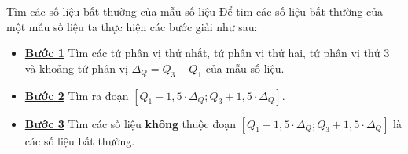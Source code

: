 \begin{dang}{Tìm các số liệu bất thường của mẫu số liệu}
	Để tìm các số liệu bất thường của một mẫu số liệu ta thực hiện các bước giải như sau:
	\begin{itemize}
		\item \textbf{\underline{Bước 1} } Tìm các tứ phân vị thứ nhất, tứ phân vị thứ hai, tứ phân vị thứ 3 và khoảng tứ phân vị $\Delta_{Q}=Q_3 - Q_1$ của mẫu số liệu.
		\item \textbf{\underline{Bước 2} } Tìm ra đoạn $\left[Q_1-1{,}5 \cdot 
		\Delta_{Q}; Q_3+1{,}5 \cdot 
		\Delta_{Q} \right]$.
		\item \textbf{\underline{Bước 3} } Tìm các số liệu \textbf{không} thuộc đoạn $\left[Q_1-1{,}5 \cdot	\Delta_{Q}; Q_3+1{,}5 \cdot \Delta_{Q} \right]$ là các số liệu bất thường.
	\end{itemize}
\end{dang}
\viduminhhoa	

